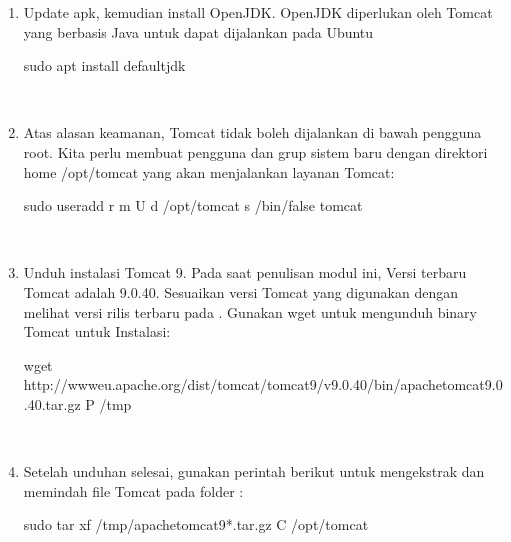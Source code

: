 \documentclass[letterpaper,10pt,english]{sphinxmanual}
\begin{document}
\begin{enumerate}
%
\item {} 
Update apk, kemudian install OpenJDK. OpenJDK diperlukan oleh Tomcat yang berbasis Java untuk dapat dijalankan pada Ubuntu

\begin{sphinxVerbatim}[commandchars=\\\{\}]
sudo apt install default\PYGZhy{}jdk
\end{sphinxVerbatim}

 

\item {} 
Atas alasan keamanan, Tomcat tidak boleh dijalankan di bawah pengguna root. Kita perlu membuat pengguna dan grup sistem baru dengan direktori home /opt/tomcat yang akan menjalankan layanan Tomcat:

\begin{sphinxVerbatim}[commandchars=\\\{\}]
sudo useradd \PYGZhy{}r \PYGZhy{}m \PYGZhy{}U \PYGZhy{}d /opt/tomcat \PYGZhy{}s /bin/false tomcat
\end{sphinxVerbatim}

 

\item {} 
Unduh instalasi Tomcat 9. Pada saat penulisan modul ini, Versi terbaru Tomcat adalah 9.0.40. Sesuaikan versi Tomcat yang digunakan dengan melihat versi rilis terbaru pada .
Gunakan wget untuk mengunduh binary Tomcat untuk Instalasi:

\begin{sphinxVerbatim}[commandchars=\\\{\}]
wget http://www\PYGZhy{}eu.apache.org/dist/tomcat/tomcat\PYGZhy{}9/v9.0.40/bin/apache\PYGZhy{}tomcat\PYGZhy{}9.0.40.tar.gz \PYGZhy{}P /tmp
\end{sphinxVerbatim}

 

\item {} 
Setelah unduhan selesai, gunakan perintah berikut untuk mengekstrak dan memindah file Tomcat pada folder :

\begin{sphinxVerbatim}[commandchars=\\\{\}]
sudo tar xf /tmp/apache\PYGZhy{}tomcat\PYGZhy{}9*.tar.gz \PYGZhy{}C /opt/tomcat
\end{sphinxVerbatim}


\end{enumerate}
\end{document}
